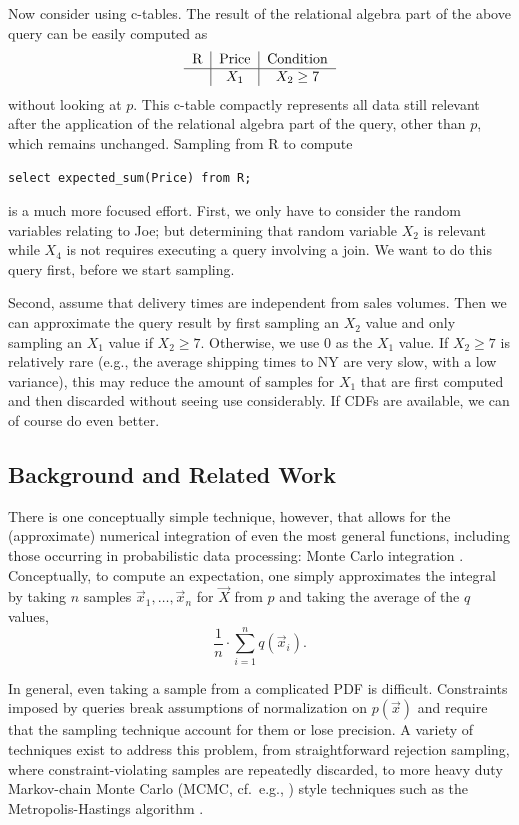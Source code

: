 \begin{example}
Now consider using c-tables. The result of the relational algebra part of the
above query can be easily computed as
\[
\begin{tabular}{c|c|c}
R & Price & Condition \\
\hline
& $X_1$ & $X_2 \ge 7$ \\
\end{tabular}
\]
without looking at $p$.
This c-table compactly represents all data still relevant after the
application of the relational algebra part of the query, other than $p$,
which remains unchanged.
Sampling from R to compute
\begin{verbatim}
select expected_sum(Price) from R;
\end{verbatim}
is a much more focused effort.
First, we only have to consider the random variables relating to Joe;
but determining that random variable $X_2$ is relevant while $X_4$
is not requires
executing a query involving a join. We want to do this query first, before
we start sampling.

Second, assume that delivery times are
independent from sales volumes. Then we can approximate the
query result
by first sampling an $X_2$ value and only sampling an $X_1$ value if $X_2 \ge 7$.
Otherwise, we use $0$ as the $X_1$ value.
If $X_2 \ge 7$ is relatively rare (e.g., the average shipping times to NY are
very slow, with a low variance), this may reduce the amount of samples
for $X_1$ that are first computed and then discarded without seeing use
considerably.
If CDFs are available, we can of course do even better.
%
\end{example}

\subsection{Background and Related Work}
There is one conceptually simple technique, however, that  allows for the (approximate) numerical integration of even  the most general  functions, including those occurring in  probabilistic data  processing: Monte Carlo integration \cite{montecarlo}. Conceptually, to compute an expectation, one simply approximates   the  integral  by  taking $n$ samples $\vec{x}_1, \dots, \vec{x}_n$ for $\vec{X}$ from $p$  and  taking  the  average of the $q$ values,
%
\begin{equation}\label{eq:mc_expectation}
\frac{1}{n} \cdot \sum_{i=1}^n q(\vec{x}_i).
\end{equation}

In general, even taking a sample from a complicated PDF is difficult.  Constraints imposed by queries break assumptions of normalization on $p(\vec x)$ and require that the sampling technique account for them or lose precision.  A variety of techniques exist to address this problem, from straightforward rejection sampling, where constraint-violating samples are repeatedly discarded, to more heavy duty Markov-chain Monte Carlo (MCMC, cf.\ e.g., \cite{GRS1995}) style techniques such as the Metropolis-Hastings algorithm \cite{metropolis,GRS1995}. 

